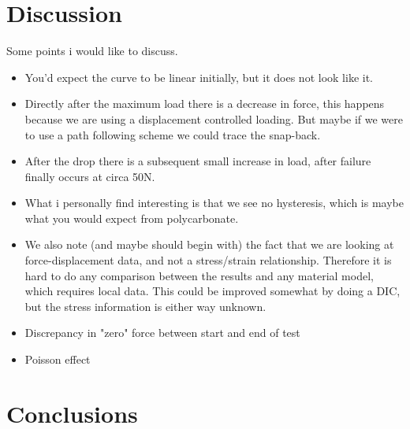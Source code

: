\documentclass[9pt,a4paper,twocolumn,twoside]{rho-class/rho}
\begin{document}
	
	\section{Discussion}
	Some points i would like to discuss.
	\begin{itemize}
		\item[] You'd expect the curve to be linear initially, but it does not look like it. 
		\item[] Directly after the maximum load there is a decrease in force, this happens because we are using a displacement controlled loading. But maybe if we were to use a path following scheme we could trace the snap-back.
		\item[] After the drop there is a subsequent small increase in load, after failure finally occurs at circa 50N.
		\item[] What i personally find interesting is that we see no hysteresis, which is maybe what you would expect from polycarbonate.
		\item[] We also note (and maybe should begin with) the fact that we are looking at force-displacement data, and not a stress/strain relationship. Therefore it is hard to do any comparison between the results and any material model, which requires local data. This could be improved somewhat by doing a DIC, but the stress information is either way unknown.
		\item[] Discrepancy in "zero" force between start and end of test
		\item[] Poisson effect
	\end{itemize}
	
	\section{Conclusions}
	
	
	\printbibliography
	
\end{document}
